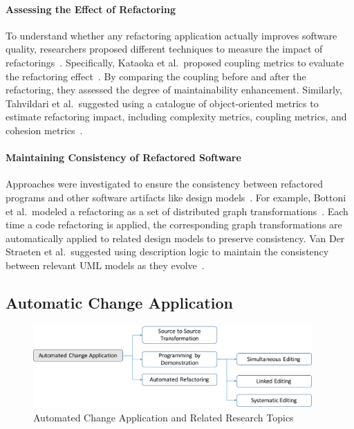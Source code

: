 \documentclass[runningheads,a4paper]{llncs}
\begin{document}
\paragraph{Assessing the Effect of Refactoring} 
To understand whether any refactoring application actually improves software quality, researchers proposed 
different techniques to measure the impact of refactorings~\cite{Kataoka2002:evaluateRefactor,Tahvildari2003:MAE}. Specifically, Kataoka et al.~proposed coupling metrics to evaluate the refactoring effect~\cite{Kataoka2002:evaluateRefactor}. By comparing the coupling before and after the refactoring, they assessed the degree of maintainability enhancement. Similarly, Tahvildari et al.~suggested using a catalogue of object-oriented metrics to estimate refactoring impact, including complexity metrics, coupling metrics, and cohesion metrics~\cite{Tahvildari2003:MAE}. 

\paragraph{Maintaining Consistency of Refactored Software} 
Approaches were investigated to ensure the consistency between refactored programs and other software artifacts like design models~\cite{Bottoni2003:coordinatedTransformation,Straeten2003:UML}. For example, Bottoni et al.~modeled a refactoring as a set of distributed graph transformations~\cite{Bottoni2003:coordinatedTransformation}. Each time a code refactoring is applied, the corresponding graph transformations are automatically applied to related design models to preserve consistency. Van Der Straeten et al.~suggested using description logic to maintain the consistency between relevant UML models as they evolve~\cite{Straeten2003:UML}.

\subsection{Automatic Change Application}
\label{sec:automatic}


\begin{figure}[ht]
 \centering
 \includegraphics[width=0.95\textwidth]{images/AutomatedChange.pdf}
 \caption{Automated Change Application and Related Research Topics} 
 \label{fig:automaticapplication} 
\end{figure}
\end{document}
